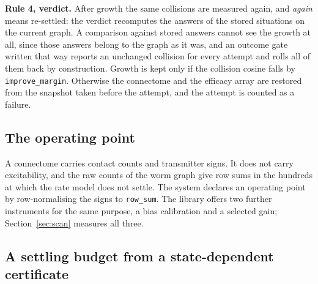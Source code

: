 \documentclass[11pt]{article}
\theoremstyle{remark}
\begin{document}
\textbf{Rule 4, verdict.} After growth the same collisions are measured again, and \emph{again}
means re-settled: the verdict recomputes the answers of the stored situations on the current graph.
A comparison against stored answers cannot see the growth at all, since those answers belong to the
graph as it was, and an outcome gate written that way reports an unchanged collision for every
attempt and rolls all of them back by construction. Growth is kept only if the collision cosine
falls by \texttt{improve\_margin}. Otherwise the connectome and the efficacy array are restored from
the snapshot taken before the attempt, and the attempt is counted as a failure.

\subsection{The operating point}

A connectome carries contact counts and transmitter signs. It does not carry excitability, and the
raw counts of the worm graph give row sums in the hundreds at which the rate model does not settle.
The system declares an operating point by row-normalising the signs to \texttt{row\_sum}. The
library offers two further instruments for the same purpose, a bias calibration and a selected gain;
Section~\ref{sec:scan} measures all three.

\subsection{A settling budget from a state-dependent certificate}
\end{document}
